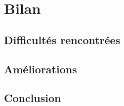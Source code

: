  \section{Bilan}

 \subsection{Difficultés rencontrées}
 
 \subsection{Améliorations}

 \subsection{Conclusion}